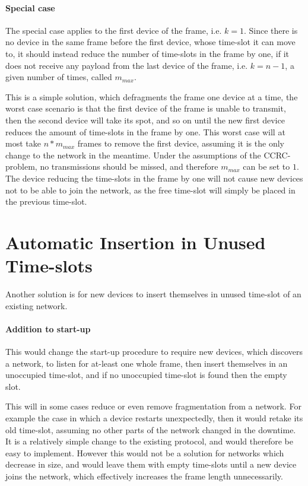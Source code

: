 \paragraph{Special case}
The special case applies to the first device of the frame, i.e. $k = 1$. 
Since there is no device in the same frame before the first device, whose time-slot it can move to, it should instead reduce the number of time-slots in the frame by one, if it does not receive any payload from the last device of the frame, i.e. $k = n - 1$, a given number of times, called $m_{max}$. 

\bigskip

This is a simple solution, which defragments the frame one device at a time, the worst case scenario is that the first device of the frame is unable to transmit, then the second device will take its spot, and so on until the new first device reduces the amount of time-slots in the frame by one. 
This worst case will at most take $n * m_{max}$ frames to remove the first device, assuming it is the only change to the network in the meantime. 
Under the assumptions of the CCRC-problem, no transmissions should be missed, and therefore $m_{max}$ can be set to $1$. 
The device reducing the time-slots in the frame by one will not cause new devices not to be able to join the network, as the free time-slot will simply be placed in the previous time-slot. 

\section{Automatic Insertion in Unused Time-slots}
Another solution is for new devices to insert themselves in unused time-slot of an existing network.

\paragraph{Addition to start-up}
This would change the start-up procedure to require new devices, which discovers a network, to listen for at-least one whole frame, then insert themselves in an unoccupied time-slot, and if no unoccupied time-slot is found then the empty slot. 

\bigskip

This will in some cases reduce or even remove fragmentation from a network. 
For example the case in which a device restarts unexpectedly, then it would retake its old time-slot, assuming no other parts of the network changed in the downtime.
It is a relatively simple change to the existing protocol, and would therefore be easy to implement.  
However this would not be a solution for networks which decrease in size, and would leave them with empty time-slots until a new device joins the network, which effectively increases the frame length unnecessarily.